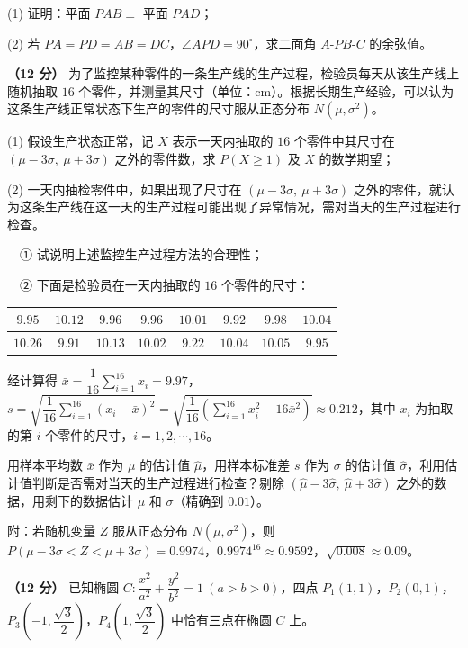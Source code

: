   (1) 证明：平面 $PAB\perp$ 平面 $PAD$；

  (2) 若 $PA=PD=AB=DC$，$\angle APD=90^\circ$，求二面角 $A\text{-}PB\text{-}C$ 的余弦值。

\textbf{（12 分）} 为了监控某种零件的一条生产线的生产过程，检验员每天从该生产线上随机抽取 $16$ 个零件，并测量其尺寸（单位：$\mathrm{cm}$）。根据长期生产经验，可以认为这条生产线正常状态下生产的零件的尺寸服从正态分布 $N\left(\mu,\sigma^{2}\right)$。

  (1) 假设生产状态正常，记 $X$ 表示一天内抽取的 $16$ 个零件中其尺寸在 $(\mu-3\sigma,\ \mu+3\sigma)$ 之外的零件数，求 $P(X\ge1)$ 及 $X$ 的数学期望；

  (2) 一天内抽检零件中，如果出现了尺寸在 $(\mu-3\sigma,\ \mu+3\sigma)$ 之外的零件，就认为这条生产线在这一天的生产过程可能出现了异常情况，需对当天的生产过程进行检查。

  　① 试说明上述监控生产过程方法的合理性；

  　② 下面是检验员在一天内抽取的 $16$ 个零件的尺寸：

\begin{center}
\begin{tabular}{cccccccc}
\toprule
$9.95$ & $10.12$ & $9.96$ & $9.96$ & $10.01$ & $9.92$ & $9.98$ & $10.04$ \\
\midrule
$10.26$ & $9.91$ & $10.13$ & $10.02$ & $9.22$ & $10.04$ & $10.05$ & $9.95$ \\
\bottomrule
\end{tabular}
\end{center}

  经计算得 $\bar x=\dfrac1{16}\sum\limits_{i=1}^{16}x_i=9.97$，$s=\sqrt{\dfrac1{16}\sum\limits_{i=1}^{16}\left(x_i-\bar x\right)^{2}}=\sqrt{\dfrac1{16}\left(\sum\limits_{i=1}^{16}x_i^{2}-16\bar x^{2}\right)}\approx0.212$，其中 $x_i$ 为抽取的第 $i$ 个零件的尺寸，$i=1,2,\cdots,16$。

  用样本平均数 $\bar x$ 作为 $\mu$ 的估计值 $\hat\mu$，用样本标准差 $s$ 作为 $\sigma$ 的估计值 $\hat\sigma$，利用估计值判断是否需对当天的生产过程进行检查？剔除 $\left(\hat\mu-3\hat\sigma,\ \hat\mu+3\hat\sigma\right)$ 之外的数据，用剩下的数据估计 $\mu$ 和 $\sigma$（精确到 $0.01$）。

  附：若随机变量 $Z$ 服从正态分布 $N\left(\mu,\sigma^{2}\right)$，则 $P(\mu-3\sigma<Z<\mu+3\sigma)=0.9974$，$0.9974^{16}\approx0.9592$，$\sqrt{0.008}\approx0.09$。

\textbf{（12 分）} 已知椭圆 $C:\dfrac{x^{2}}{a^{2}}+\dfrac{y^{2}}{b^{2}}=1\ (a>b>0)$，四点 $P_1(1,1)$，$P_2(0,1)$，$P_3\left(-1,\dfrac{\sqrt3}2\right)$，$P_4\left(1,\dfrac{\sqrt3}2\right)$ 中恰有三点在椭圆 $C$ 上。

